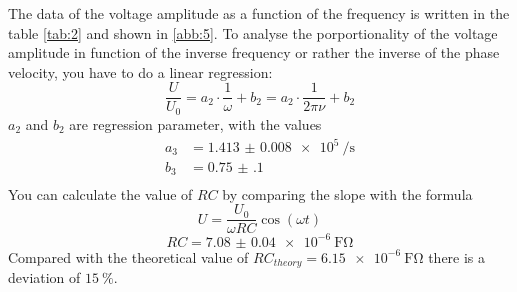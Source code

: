 The data of the voltage amplitude as a function of the frequency is written
in the table \ref{tab:2} and shown in \ref{abb:5}. To analyse the porportionality of the voltage amplitude
in function of the inverse frequency or rather the inverse of the phase velocity,
you have to do a linear regression:
\begin{equation*}
  \frac{U}{U_0} = a_2 \cdot \frac{1}{\omega} + b_2 = a_2 \cdot \frac{1}{2 \pi \nu} + b_2
\end{equation*}
$a_2$ and $b_2$ are regression parameter, with the values
\begin{align*}
  a_3 &= \SI{1.413(8)e5}{\per\second} \\
  b_3 &= \SI{0.75(10)}{} \\
\end{align*}
You can calculate the value of $RC$ by comparing the slope with the formula
\begin{equation}
  \label{eq:1}
  U = \frac{U_0}{\omega R C} \cos{(\omega t)}
\end{equation}
\begin{equation*}
  RC = \SI{7.08(4)e-6}{\farad\ohm}
\end{equation*}
Compared with the theoretical value of $RC_{theory}= \SI{6.15e-6}{\farad\ohm}$ there is a
deviation of $\SI{15}{\percent}$.
